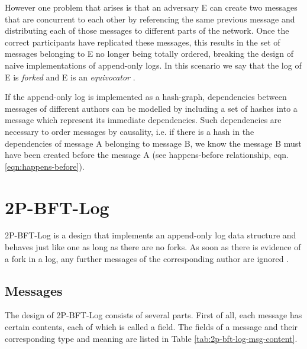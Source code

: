 However one problem that arises is that an adversary E can create two messages that are concurrent to each other by referencing the same previous message and distributing each of those messages to different parts of the network. Once the correct participants have replicated these messages, this results in the set of messages belonging to E no longer being totally ordered, breaking the design of naive implementations of append-only logs. In this scenario we say that the log of E is \emph{forked} and E is an \emph{equivocator} \cite{blocklace-crdt}.

If the append-only log is implemented as a hash-graph, dependencies between messages of different authors can be modelled by including a set of hashes into a message which represent its immediate dependencies. Such dependencies are necessary to order messages by causality, i.e. if there is a hash in the dependencies of message A belonging to message B, we know the message B must have been created before the message A (see happens-before relationship, eqn. \ref{eqn:happens-before}).

\section{2P-BFT-Log}
2P-BFT-Log is a design that implements an append-only log data structure and behaves just like one as long as there are no forks. As soon as there is evidence of a fork in a log, any further messages of the corresponding author are ignored \cite{2p-bft-log}.

\subsection{Messages}
The design of 2P-BFT-Log consists of several parts. First of all, each message has certain contents, each of which is called a field. The fields of a message and their corresponding type and meaning are listed in Table \ref{tab:2p-bft-log-msg-content}.

